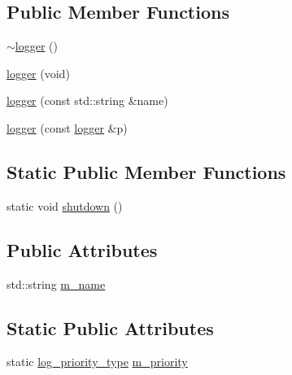 \subsection*{Public Member Functions}
\begin{DoxyCompactItemize}
\item 
\hyperlink{structpion_1_1logger_abcd0ce04339a55c7268b4009c2a7a60c}{$\sim$logger} ()
\item 
\hyperlink{structpion_1_1logger_a4ea34e7e8f534ce97e288a2753afccf3}{logger} (void)
\item 
\hyperlink{structpion_1_1logger_a3b7ea2992e65a6a35f25bde03ea3be6e}{logger} (const std\-::string \&name)
\item 
\hyperlink{structpion_1_1logger_a6a68a76812570e28a2e98c60b9d7eb0f}{logger} (const \hyperlink{structpion_1_1logger}{logger} \&p)
\end{DoxyCompactItemize}
\subsection*{Static Public Member Functions}
\begin{DoxyCompactItemize}
\item 
static void \hyperlink{structpion_1_1logger_a2e9f33f545c83e3c6f59df3e067b9181}{shutdown} ()
\end{DoxyCompactItemize}
\subsection*{Public Attributes}
\begin{DoxyCompactItemize}
\item 
std\-::string \hyperlink{structpion_1_1logger_a4093c40a7d1be8af9a0106b0751ed68e}{m\-\_\-name}
\end{DoxyCompactItemize}
\subsection*{Static Public Attributes}
\begin{DoxyCompactItemize}
\item 
static \hyperlink{structpion_1_1logger_a028e0caa7e4d190f0bbf629cd15456b8}{log\-\_\-priority\-\_\-type} \hyperlink{structpion_1_1logger_a29cca3a109b06a74a38cd452c9c7ef70}{m\-\_\-priority}
\end{DoxyCompactItemize}


